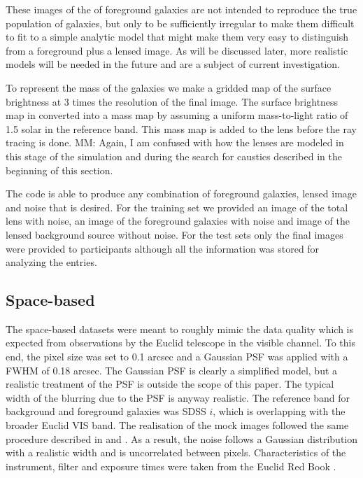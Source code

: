 \documentclass[useAMS,usenatbib]{mnras}
\begin{document}
These images of the of foreground galaxies are not intended to reproduce the true population of galaxies, but only to be sufficiently irregular to make them difficult to fit to a simple analytic model that might make them very easy to distinguish from a foreground plus a lensed image.   As will be discussed later, more realistic models will be needed in the future and are a subject of current investigation.

To represent the mass of the galaxies we make a gridded map of the surface brightness at 3 times the resolution of the final image.  The surface brightness map in converted into a mass map by assuming a uniform mass-to-light ratio of 1.5 solar in the reference band.  This mass map is added to the lens before the ray tracing is done. {\color{red} MM: Again, I am confused with how the lenses are modeled in this stage of the simulation and during the search for caustics described in the beginning of this section.}

The code is able to produce any combination of foreground galaxies, lensed image and noise that is desired.  For the training set we provided an image of the total lens with noise, an image of the foreground galaxies with noise and image of the lensed background source without noise.
For the test sets only the final images were provided to participants although all the information was stored for analyzing the entries.

\subsection{Space-based}
\label{sec:sim-space-based}

The space-based datasets were meant to roughly mimic the data quality which is expected from observations by the Euclid telescope in the visible channel. To this end, the pixel size was set to 0.1 arcsec and a Gaussian PSF was applied with a FWHM of 0.18 arcsec. The Gaussian PSF is clearly a simplified model, but a realistic treatment of the PSF is outside the scope of this paper. The typical width of the blurring due to the PSF is anyway realistic. The reference band for background and foreground galaxies was SDSS $i$, which is overlapping with the broader Euclid VIS band. The realisation of the mock images followed the same procedure described in \citet{2004PASP..116..750G} and \citet{2008A&A...482..403M}. As a result, the noise follows a Gaussian distribution with a realistic width and is uncorrelated between pixels. Characteristics of the instrument, filter and exposure times were taken from the Euclid Red Book \citep{2011arXiv1110.3193L}.
 
\end{document}
